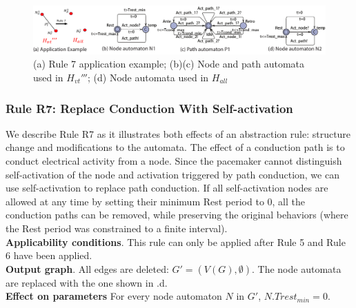 \begin{figure}[!t]
	\centering
	\includegraphics[width=1.05\textwidth]{figs/rule5.pdf}
	\caption{\small (a) Rule 7 application example; (b)(c) Node and path automata used in $H_{vt}'''$; (d) Node automata used in $H_{all}$ }
	\vspace{-15pt}
	\label{fig:rule5}
\end{figure}

\subsubsection{Rule R7: Replace Conduction With Self-activation}
We describe Rule R7 as it illustrates both effects of an abstraction rule: structure change and modifications to the automata.
The effect of a conduction path is to conduct electrical activity from a node. Since the pacemaker cannot distinguish self-activation of the node and activation triggered by path conduction, we can use self-activation to replace path conduction.
If all self-activation nodes are allowed at any time by setting their minimum Rest period to 0, all the conduction paths can be removed, while preserving the original behaviors (where the Rest period was constrained to a finite interval).\\
\textbf{Applicability conditions}.
This rule can only be applied after Rule 5 and Rule 6 have been applied.\\
\textbf{Output graph}.
All edges are deleted: $G' = (V(G), \emptyset)$. The node automata are replaced with the one shown in .d.\\
\textbf{Effect on parameters}
For every node automaton $N$ in $G'$, $N.Trest_{min}=0$.\\

